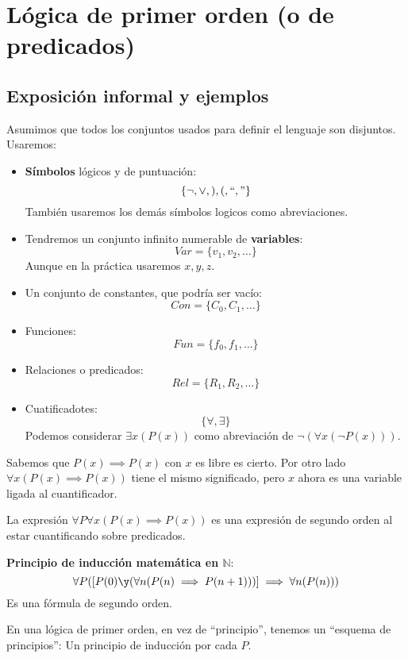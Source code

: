 \section{Lógica de primer orden (o de predicados)}
\subsection{Exposición informal y ejemplos}
Asumimos que todos los conjuntos usados para definir el lenguaje son disjuntos. Usaremos:
\begin{itemize}
	\item \textbf{Símbolos} lógicos y de puntuación:
	$$\{\neg, \vee, ),(, ``," \}$$
	También usaremos los demás símbolos logicos como abreviaciones.
	\item Tendremos un conjunto infinito numerable de \textbf{variables}:
	$$Var = \{v_1, v_2, \hdots\}$$
	Aunque en la práctica usaremos $x,y,z$.
	\item Un conjunto de constantes, que podría ser vacío:
	$$Con = \{C_0, C_1, \hdots\}$$
	\item Funciones:
	$$Fun = \{f_0, f_1, \hdots\}$$
	\item Relaciones o predicados:
	$$Rel = \{R_1, R_2, \hdots\}$$
	\item Cuatificadotes:
	$$\{\forall, \exists\}$$
	Podemos considerar $\exists x(P(x))$ como abreviación de $\neg (\forall x(\neg P(x)))$.
\end{itemize} 

\begin{example} Sabemos que $P(x) \implies P(x)$ con $x$ es libre es cierto. Por otro lado $\forall x(P(x)\implies P(x))$ tiene el mismo significado, pero $x$ ahora es una variable ligada al cuantificador.
\end{example}

\begin{example} La expresión $\forall P \forall x (P(x)\implies P(x))$ es una expresión de segundo orden al estar cuantificando sobre predicados.
\end{example}

\begin{mdframed}
	\textbf{Principio de inducción matemática en $\mathbb{N}$}:
	$$\forall P (\left[P(0)\y (\forall n(P(n)\implies P(n+1)))\right]\implies \forall n(P(n)))$$
	Es una fórmula de segundo orden.
\end{mdframed}
En una lógica de primer orden, en vez de ``principio'', tenemos un ``esquema de principios'': Un principio de inducción por cada $P$.

